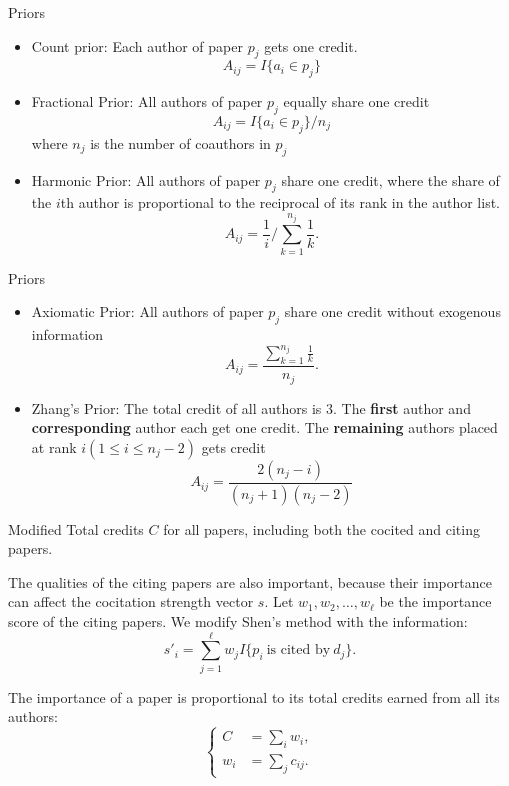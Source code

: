 \documentclass{beamer}
\begin{document}
\begin{frame}{Priors}
\begin{itemize}
\item Count prior: Each author of paper $p_j$ gets one credit.
\[A_{ij} = I\{a_i\in p_j\}\]
\item Fractional Prior: All authors of paper $p_j$ equally share one credit
\[A_{ij}=I\{a_i\in p_j\}/n_j\]
where $n_j$ is the number of coauthors in $p_j$
\item Harmonic Prior: All authors of paper $p_j$ share one credit, where the share of the $i$th author is proportional to the reciprocal of its rank in the author list.
\[
A_{ij}=\frac{1}{i}/\sum_{k=1}^{n_j} \frac{1}{k}.
\]
\end{itemize}
\end{frame}

\begin{frame}{Priors}
\begin{itemize}
\item Axiomatic Prior: All authors of paper $p_j$ share one credit without exogenous information
\[
A_{ij}=\frac{\sum_{k=1}^{n_j} \frac{1}{k}}{n_j}.
\]
\item Zhang's Prior: The total credit of all authors is $3$. The \textbf{first} author and \textbf{corresponding} author each get one credit. The \textbf{remaining} authors placed at rank $i (1\le i\le n_j-2)$ gets credit
\[
A_{ij} = \frac{2(n_j-i)}{(n_j+1)(n_j-2)}
\]
\end{itemize}
\end{frame}

\begin{frame}{Modified}
Total credits $C$ for all papers, including both the cocited and citing papers.

The qualities of the citing papers are also important, because their importance can affect the cocitation strength vector $s$. Let $w_1,w_2,\ldots,w_\ell$ be the importance score of the citing papers. We modify Shen's method with the information:
\[
s'_i = \sum_{j=1}^{\ell} w_j I\{p_i~\textrm{is cited by}~d_j\}.
\]

The importance of a paper is proportional to its total credits earned from all its authors:
\[
\left\{
\begin{array}{rl}
C & = \sum_i w_i,\\ 
w_i & = \sum_j c_{ij}.
\end{array}
\right.
\]

\end{frame}
\end{document}
